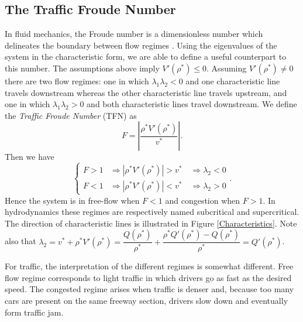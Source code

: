 \documentclass[a4paper, 10pt, conference]{ieeeconf}      %
\begin{document}
\subsection{The Traffic Froude Number}
In fluid mechanics, the Froude number is a dimensionless number which delineates the boundary between flow regimes \cite{Sturm, litrico2009modeling}. Using the eigenvalues of the system in the characteristic form, we are able to define a useful counterpart to this number. 
The assumptions above imply $V'(\rho^*) \leq 0$. Assuming $V'(\rho^*) \neq 0$ there are two flow regimes: one in which $\lambda_1 \lambda_2 < 0$ and one characteristic line travels downstream whereas the other characteristic line travels upstream, and one in which $\lambda_1 \lambda_2 > 0$ and both characteristic lines travel downstream. We define the \textit{Traffic Froude Number} (TFN) as
\begin{equation}
F = \left\lvert\dfrac{\rho^*V'( \rho^*)}{v^*}\right\rvert.
\end{equation}
Then we have
{\footnotesize
\begin{equation*}
\begin{cases}
F > 1 &\Rightarrow |\rho^*V'(\rho^*)| > v^* \quad \Rightarrow \lambda_2  <0 \\
F < 1 &\Rightarrow |\rho^*V'(\rho^*)| < v^* \quad \Rightarrow \lambda_2 > 0
\end{cases}.
\end{equation*}
}
Hence the system is in free-flow when $F<1$ and congestion when $F>1$. In hydrodynamics these regimes are respectively named subcritical and supercritical\cite{litrico2009modeling}. The direction of characteristic lines is illustrated in Figure \ref{Characteristics}. Note also that {\footnotesize$\lambda_2 = v^* + \rho^* V'( \rho^*) = \dfrac{Q(\rho^*)}{\rho^*} + \dfrac{\rho^*Q'(\rho^*)-Q(\rho^*)}{\rho^*} = Q'(\rho^*)$}.

For traffic, the interpretation of the different regimes is somewhat different. Free flow regime corresponds to light traffic in which drivers go as fast as the desired speed. The congested regime arises when traffic is denser and, because too many cars are present on the same freeway section, drivers slow down and eventually form traffic jam.
\end{document}
